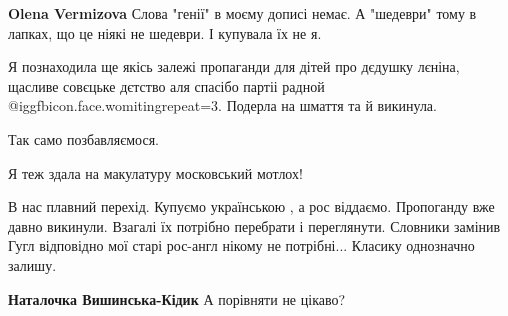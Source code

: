 \begin{itemize}
\begin{itemize}
\textbf{Olena Vermizova} Слова "генії" в моєму дописі немає. А "шедеври" тому в лапках, що це ніякі не шедеври. І купувала їх не я.

\end{itemize}

 

Я познаходила ще якісь залежі пропаганди для дітей про дєдушку лєніна, щасливе
совєцьке дєтство аля спасібо партіі радной  @igg{fbicon.face.womiting}{repeat=3}. Подерла на шмаття та й
викинула.


 
Так само позбавляємося.

 
Я теж здала на макулатуру московський мотлох!

 

В нас плавний перехід. Купуємо українською , а рос віддаємо. Пропоганду вже
давно викинули. Взагалі їх потрібно перебрати і переглянути. Словники замінив
Гугл відповідно мої старі рос-англ нікому не потрібні... Класику однозначно
залишу.

\begin{itemize}
 
\textbf{Наталочка Вишинська-Кідик} А порівняти не цікаво?
\end{itemize}


\end{itemize}
